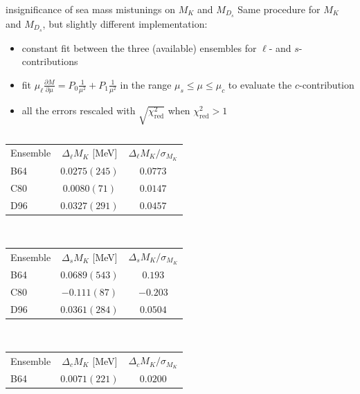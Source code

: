\documentclass[xcolor={dvipsnames,table}]{beamer}
\begin{document}
\begin{frame}{insignificance of sea mass mistunings on $M_K$ and $M_{D_s}$}
  Same procedure for $M_K$ and $M_{D_s}$, but slightly different implementation: 
  \begin{itemize}
  \item constant fit between the three (available) ensembles for $\ell$- and $s$-contributions
  \item fit $\mu_\ell  \frac{\partial M }{\partial\mu} = P_0\frac{1}{\mu^2}+P_1\frac{1}{\mu^2}$ in the range $\mu_s\le\mu\le\mu_c$ to evaluate the $c$-contribution
  \item all the errors rescaled with $\sqrt{\chi^2_\mathrm{red}}$ when $\chi^2_\mathrm{red}>1$ 
  \end{itemize}
\begin{columns}
    \begin{column}{0.5\textwidth}
       \begin{center}
       \begin{tabular}{l|c|c}
       Ensemble
       & $\Delta_{\ell}M_{K}$ [MeV]
       & $\Delta_{\ell}M_{K}/\sigma_{M_{K}}$ \\
       B64  & $0.0275(245)$ & $0.0773$ \\
       C80  & $0.0080(71)$  & $0.0147$ \\
       D96  & $0.0327(291)$ & $0.0457$ \\
       \end{tabular}
       \vspace*{0.2cm}\,
       \\
       \begin{tabular}{l|c|c}
       Ensemble
       & $\Delta_{s}M_{K}$ [MeV]
       & $\Delta_{s}M_{K}/\sigma_{M_{K}}$ \\
       B64  & $0.0689(543)$  & $0.193$ \\
       C80  & $-0.111(87)$   & $-0.203$ \\
       D96  & $0.0361(284)$  & $0.0504$ \\
       \end{tabular}
       \vspace*{0.2cm}\,
       \\
       \begin{tabular}{l|c|c}
       Ensemble
       & $\Delta_{c}M_{K}$ [MeV]
       & $\Delta_{c}M_{K}/\sigma_{M_{K}}$ \\
       B64  & $0.0071(221)$  & $0.0200$ \\

\end{tabular}
\end{center}
\end{column}
\end{columns}
\end{frame}
\end{document}
